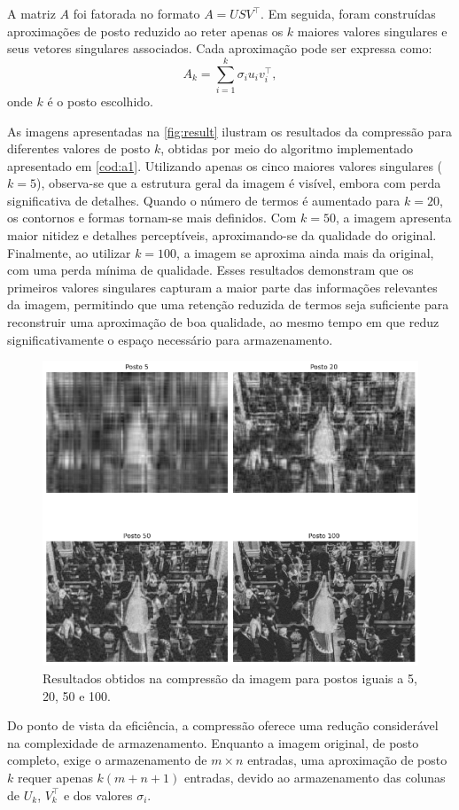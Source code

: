 A matriz \( A \) foi fatorada no formato \( A = U S V^\top \). Em seguida, foram construídas aproximações de posto reduzido ao reter apenas os \( k \) maiores valores singulares e seus vetores singulares associados. Cada aproximação pode ser expressa como:
\begin{equation}
  A_k = \sum_{i=1}^k \sigma_i u_i v_i^\top,
\end{equation}
onde \( k \) é o posto escolhido.

As imagens apresentadas na \autoref{fig:result} ilustram os resultados da compressão para diferentes valores de posto \( k \), obtidas por meio do algoritmo implementado apresentado em \autoref{cod:a1}. Utilizando apenas os cinco maiores valores singulares (\( k = 5 \)), observa-se que a estrutura geral da imagem é visível, embora com perda significativa de detalhes. Quando o número de termos é aumentado para \( k = 20 \), os contornos e formas tornam-se mais definidos. Com \( k = 50 \), a imagem apresenta maior nitidez e detalhes perceptíveis, aproximando-se da qualidade do original. Finalmente, ao utilizar \( k = 100 \), a imagem se aproxima ainda mais da original, com uma perda mínima de qualidade. Esses resultados demonstram que os primeiros valores singulares capturam a maior parte das informações relevantes da imagem, permitindo que uma retenção reduzida de termos seja suficiente para reconstruir uma aproximação de boa qualidade, ao mesmo tempo em que reduz significativamente o espaço necessário para armazenamento.

\begin{figure}
  \includegraphics[width=1.\textwidth]{Figures/result.png}
  \caption{Resultados obtidos na compressão da imagem para postos iguais a 5, 20, 50 e 100.}
  \label{fig:result}
\end{figure}


Do ponto de vista da eficiência, a compressão oferece uma redução considerável na complexidade de armazenamento. Enquanto a imagem original, de posto completo, exige o armazenamento de \( m \times n \) entradas, uma aproximação de posto \( k \) requer apenas \( k (m + n + 1) \) entradas, devido ao armazenamento das colunas de \( U_k \), \( V_k^\top \) e dos valores \( \sigma_i \).